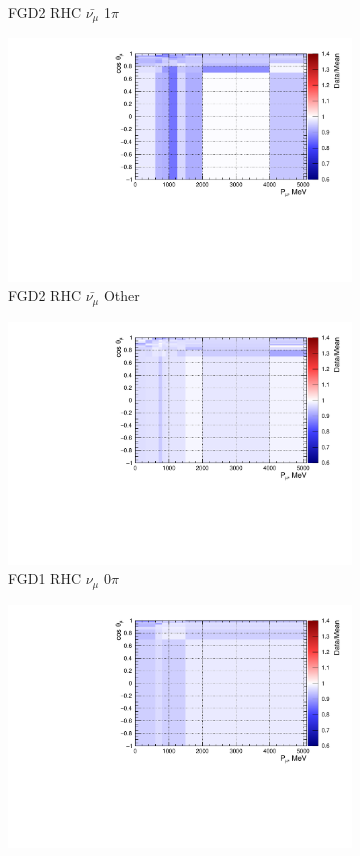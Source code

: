 \begin{figure}
\begin{subfigure}{.32\textwidth}
  \caption{FGD2 RHC $\bar{\nu_{\mu}}$ 1$\pi$}
  \label{fig:priorpred_FGD2_anti-numuCC_1pi}
\end{subfigure}
\begin{subfigure}{.32\textwidth}
  \centering
  \includegraphics[width=0.85\linewidth]{figs/priorpred_FGD2_anti-numuCC_other.pdf}
  \caption{FGD2 RHC $\bar{\nu_{\mu}}$ Other}
  \label{fig:priorpred_FGD2_anti-numuCC_other}
\end{subfigure}
\begin{subfigure}{.32\textwidth}
  \centering
  \includegraphics[width=0.85\linewidth]{figs/priorpred_FGD1_NuMuBkg_CC0pi_in_AntiNu_Mode.pdf}
  \caption{FGD1 RHC $\nu_{\mu}$ 0$\pi$}
  \label{fig:priorpred_FGD1_NuMuBkg_CC0pi_in_AntiNu_Mode}
\end{subfigure}
\begin{subfigure}{.32\textwidth}
  \centering
  \includegraphics[width=0.85\linewidth]{figs/priorpred_FGD1_NuMuBkg_CC1pi_in_AntiNu_Mode.pdf}

\end{subfigure}
\end{figure}
